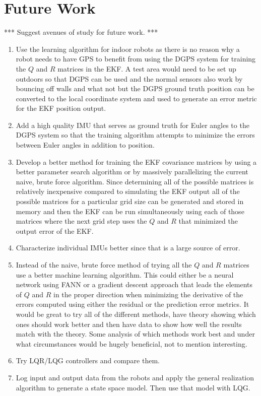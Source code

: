 \chapter{Future Work}
\label{ch:futurework}
*** Suggest avenues of study for future work. ***

\begin{enumerate}
\item Use the learning algorithm for indoor robots as there is no reason why a robot needs to have GPS to benefit from using the DGPS system for training the $Q$ and $R$ matrices in the EKF. A test area would need to be set up outdoors so that DGPS can be used and the normal sensors also work by bouncing off walls and what not but the DGPS ground truth position can be converted to the local coordinate system and used to generate an error metric for the EKF position output.
\item Add a high quality IMU that serves as ground truth for Euler angles to the DGPS system so that the training algorithm attempts to minimize the errors between Euler angles in addition to position.
\item Develop a better method for training the EKF covariance matrices by using a better parameter search algorithm or by massively parallelizing the current naive, brute force algorithm. Since determining all of the possible matrices is relatively inexpensive compared to simulating the EKF output all of the possible matrices for a particular grid size can be generated and stored in memory and then the EKF can be run simultaneously using each of those matrices where the next grid step uses the $Q$ and $R$ that minimized the output error of the EKF.
\item Characterize individual IMUs better since that is a large source of error.
\item Instead of the naive, brute force method of trying all the $Q$ and $R$ matrices use a better machine learning algorithm. This could either be a neural network using FANN or a gradient descent approach that leads the elements of $Q$ and $R$ in the proper direction when minimizing the derivative of the errors computed using either the residual or the prediction error metrics. It would be great to try all of the different methods, have theory showing which ones should work better and then have data to show how well the results match with the theory. Some analysis of which methods work best and under what circumstances would be hugely beneficial, not to mention interesting.
\item Try LQR/LQG controllers and compare them.
\item Log input and output data from the robots and apply the general realization algorithm \cite{deCallafonGRA08} to generate a state space model. Then use that model with LQG.
\end{enumerate}
